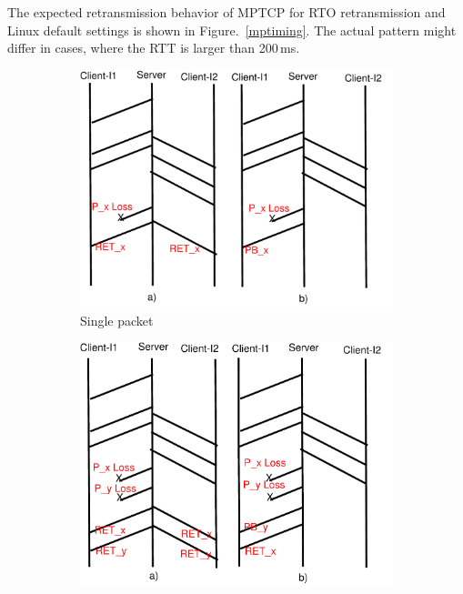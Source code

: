 \documentclass[10pt,conference]{IEEEtran}
\begin{document}
The expected retransmission behavior of MPTCP for RTO retransmission and Linux default settings is shown 
in Figure.~\ref{mptiming}. The actual pattern might differ in cases, where the RTT is larger than 200\,ms. 
\renewcommand{\thesubfigure}{\roman{subfigure}}
\begin{figure}[!tbp]
 \begin{subfigure}[b]{0.32\textwidth}
	\includegraphics[angle=0, width=\textwidth, natwidth=610, natheight=400]{images/timing1P.pdf}
	\caption{Single packet}\label{timing1P}
 \end{subfigure}
 \hfill
 \begin{subfigure}[b]{0.32\textwidth} 
	\includegraphics[angle=0, width=\textwidth, natwidth=610, natheight=400]{images/timing2P.pdf}

\end{subfigure}
\end{figure}
\end{document}
